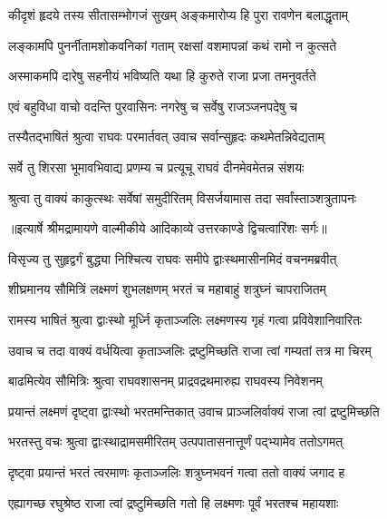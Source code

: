 \twolineshloka
{कीदृशं हृदये तस्य सीतासम्भोगजं सुखम्}
{अङ्कमारोप्य हि पुरा रावणेन बलाद्धृताम्} %

\twolineshloka
{लङ्कामपि पुनर्नीतामशोकवनिकां गताम्}
{रक्षसां वशमापन्नां कथं रामो न कुत्सते} %

\twolineshloka
{अस्माकमपि दारेषु सहनीयं भविष्यति}
{यथा हि कुरुते राजा प्रजा तमनुवर्तते} %

\twolineshloka
{एवं बहुविधा वाचो वदन्ति पुरवासिनः}
{नगरेषु च सर्वेषु राजञ्जनपदेषु च} %

\twolineshloka
{तस्यैतद्भाषितं श्रुत्वा राघवः परमार्तवत्}
{उवाच सर्वान्सुहृदः कथमेतन्निवेद्यताम्} %

\twolineshloka
{सर्वे तु शिरसा भूमावभिवाद्य प्रणम्य च}
{प्रत्यूचू राघवं दीनमेवमेतन्न संशयः} %

\twolineshloka
{श्रुत्वा तु वाक्यं काकुत्स्थः सर्वेषां समुदीरितम्}
{विसर्जयामास तदा सर्वांस्ताञ्शत्रुतापनः} %


{॥इत्यार्षे श्रीमद्रामायणे वाल्मीकीये आदिकाव्ये उत्तरकाण्डे द्विचत्वारिंशः सर्गः॥}


\twolineshloka
{विसृज्य तु सुहृद्वर्गं बुद्ध्या निश्चित्य राघवः}
{समीपे द्वाःस्थमासीनमिदं वचनमब्रवीत्} %

\twolineshloka
{शीघ्रमानय सौमित्रिं लक्ष्मणं शुभलक्षणम्}
{भरतं च महाबाहुं शत्रुघ्नं चापराजितम्} %

\twolineshloka
{रामस्य भाषितं श्रुत्वा द्वाःस्थो मूर्ध्नि कृताञ्जलिः}
{लक्ष्मणस्य गृहं गत्वा प्रविवेशानिवारितः} %

\twolineshloka
{उवाच च तदा वाक्यं वर्धयित्वा कृताञ्जलिः}
{द्रष्टुमिच्छति राजा त्वां गम्यतां तत्र मा चिरम्} %

\twolineshloka
{बाढमित्येव सौमित्रिः श्रुत्वा राघवशासनम्}
{प्राद्रवद्रथमारुह्य राघवस्य निवेशनम्} %

\twolineshloka
{प्रयान्तं लक्ष्मणं दृष्ट्वा द्वाःस्थो भरतमन्तिकात्}
{उवाच प्राञ्जलिर्वाक्यं राजा त्वां द्रष्टुमिच्छति} %

\twolineshloka
{भरतस्तु वचः श्रुत्वा द्वाःस्थाद्रामसमीरितम्}
{उत्पपातासनात्तूर्णं पद्भ्यामेव ततोऽगमत्} %

\twolineshloka
{दृष्ट्वा प्रयान्तं भरतं त्वरमाणः कृताञ्जलिः}
{शत्रुघ्नभवनं गत्वा ततो वाक्यं जगाद ह} %

\twolineshloka
{एह्यागच्छ रघुश्रेष्ठ राजा त्वां द्रष्टुमिच्छति}
{गतो हि लक्ष्मणः पूर्वं भरतश्च महायशाः} %

